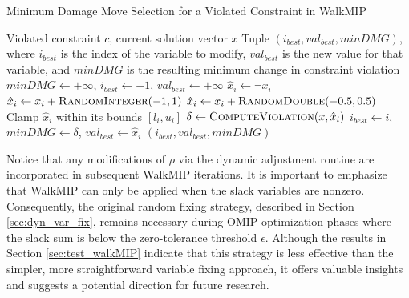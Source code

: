 \begin{algorithm}[H]
\caption{Minimum Damage Move Selection for a Violated Constraint in WalkMIP}
\begin{algorithmic}
\Require Violated constraint $c$, current solution vector $x$
\Ensure Tuple $(i_{best}, val_{best}, minDMG)$, where $i_{best}$ is the index of the variable to modify, $val_{best}$ is the new value for that variable, and $minDMG$ is the resulting minimum change in constraint violation
\label{alg:min_DMG_WalkMIP}
    \State $minDMG \gets +\infty$, $i_{best} \gets -1$, $val_{best} \gets +\infty$
         $\hat{x}_i \gets \neg x_i$
         $\hat{x}_i \gets x_i + \Call{RandomInteger}{-1,1}$
         $\hat{x}_i \gets x_i + \Call{RandomDouble}{-0.5,0.5}$
        \EndIf
        \State Clamp $\hat{x}_i$ within its bounds $[l_i,u_i]$
        \State $\delta \gets \Call{ComputeViolation}{x,\hat{x}_i}$
            \State $i_{best} \gets i$, $minDMG \gets \delta$, $val_{best} \gets \hat{x}_i$
        \EndIf
    \EndFor
    \State \Return $(i_{best}, val_{best}, minDMG)$
\EndFunction
\end{algorithmic}
\end{algorithm}

Notice that any modifications of $\rho$ via the dynamic adjustment routine are incorporated in subsequent WalkMIP iterations. It is important to emphasize that WalkMIP can only be applied when the slack variables are nonzero. Consequently, the original random fixing strategy, described in Section \ref{sec:dyn_var_fix}, remains necessary during OMIP optimization phases where the slack sum is below the zero-tolerance threshold $\epsilon$.
Although the results in Section \ref{sec:test_walkMIP} indicate that this strategy is less effective than the simpler, more straightforward variable fixing approach, it offers valuable insights and suggests a potential direction for future research.